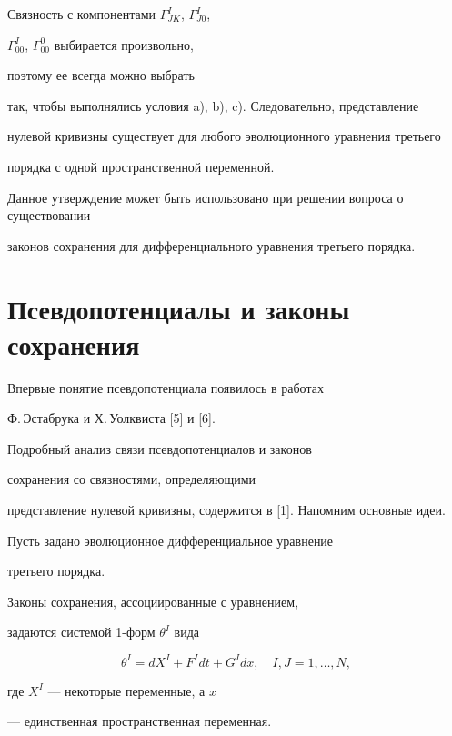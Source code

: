 \begin{notenonum}


Связность с компонентами $\Gamma^I_{JK}$, $\Gamma^I_{J0}$,


$\Gamma^I_{00}$, $\Gamma^0_{00}$ выбирается произвольно,


поэтому ее всегда можно выбрать


так, чтобы выполнялись условия a), b), c). Следовательно, представление


нулевой кривизны существует для любого эволюционного уравнения третьего


порядка с одной пространственной переменной.


\end{notenonum}





Данное утверждение может быть использовано при решении вопроса о существовании


законов сохранения для дифференциального уравнения третьего порядка.





\section{Псевдопотенциалы и законы сохранения}





Впервые понятие псевдопотенциала появилось в работах


Ф.\,Эстабрука и Х.\,Уолквиста [5] и [6].


Подробный анализ связи псевдопотенциалов и законов 


сохранения со связностями, определяющими


представление нулевой кривизны, содержится в [1]. Напомним основные идеи.


Пусть задано эволюционное дифференциальное уравнение


третьего порядка.


Законы сохранения, ассоциированные с уравнением, 


задаются системой 1-форм $\theta^I$ вида


$$


\theta^I=dX^I+F^Idt+G^Idx, \quad I,J=1,\dotsc,N,


$$


где $X^I$ --- некоторые переменные, а $x$


--- единственная пространственная переменная. 


